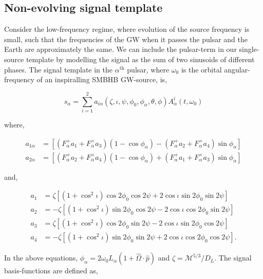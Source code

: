 \documentclass[prd,showpacs,nofootinbib]{revtex4}
\begin{document}
\subsection{Non-evolving signal template}

Consider the low-frequency regime, where evolution of the source frequency is small, such that the frequencies of the GW when it passes the pulsar and the Earth are approximately the same. We can include the pulsar-term in our single-source template by modelling the signal as the sum of two sinusoids of different phases. The signal template in the $\alpha^{\text{th}}$ pulsar, where $\omega_0$ is the orbital angular-frequency of an inspiralling SMBHB GW-source, is,

\begin{equation}\label{eq:non-evolve-template}
s_{\alpha} = \sum_{i=1}^2 a_{i\alpha}(\zeta,\iota,\psi,\phi_0,\phi_{\alpha},\theta,\phi)A^i_{\alpha}(t,\omega_0)
\end{equation}

where,

\begin{align}
a_{1\alpha} &= \left[\left(F^+_{\alpha}a_1+F^{\times}_{\alpha}a_3\right)\left(1-\cos\phi_{\alpha}\right)-\left(F^+_{\alpha}a_2+F^{\times}_{\alpha}a_4\right)\sin\phi_{\alpha}\right] \nonumber\\
a_{2\alpha} &= \left[\left(F^+_{\alpha}a_2+F^{\times}_{\alpha}a_4\right)\left(1-\cos\phi_{\alpha}\right)+\left(F^+_{\alpha}a_1+F^{\times}_{\alpha}a_3\right)\sin\phi_{\alpha}\right] 
\end{align} 

and,

\begin{align}
a_1 &= \zeta\left[\left(1+\cos^2\iota\right)\cos2\phi_0\cos2\psi + 2\cos\iota\sin2\phi_0\sin2\psi\right]  \nonumber\\
a_2 &= -\zeta\left[\left(1+\cos^2\iota\right)\sin2\phi_0\cos2\psi - 2\cos\iota\cos2\phi_0\sin2\psi\right]  \nonumber\\
a_3 &= \zeta\left[\left(1+\cos^2\iota\right)\cos2\phi_0\sin2\psi - 2\cos\iota\sin2\phi_0\cos2\psi\right]  \nonumber\\
a_4 &= -\zeta\left[\left(1+\cos^2\iota\right)\sin2\phi_0\sin2\psi + 2\cos\iota\cos2\phi_0\cos2\psi\right].
\end{align}

In the above equations, $\phi_{\alpha} = 2\omega_0L_{\alpha}(1+\hat\Omega\cdot\hat{p})$ and $\zeta=\mathcal{M}^{5/3}/D_L$. The signal basis-functions are defined as,
\end{document}
